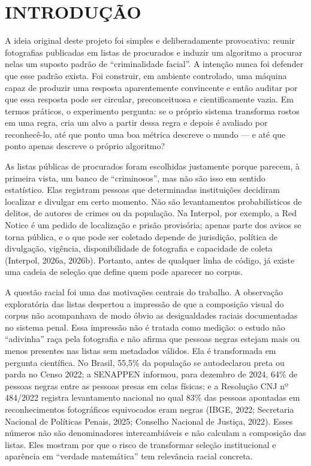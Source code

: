 \chapter{INTRODUÇÃO}

A ideia original deste projeto foi simples e deliberadamente provocativa: reunir fotografias publicadas em listas de procurados e induzir um algoritmo a procurar nelas um suposto padrão de ``criminalidade facial''. A intenção nunca foi defender que esse padrão exista. Foi construir, em ambiente controlado, uma máquina capaz de produzir uma resposta aparentemente convincente e então auditar por que essa resposta pode ser circular, preconceituosa e cientificamente vazia. Em termos práticos, o experimento pergunta: se o próprio sistema transforma rostos em uma regra, cria um alvo a partir dessa regra e depois é avaliado por reconhecê-lo, até que ponto uma boa métrica descreve o mundo --- e até que ponto apenas descreve o próprio algoritmo?

As listas públicas de procurados foram escolhidas justamente porque parecem, à primeira vista, um banco de ``criminosos'', mas não são isso em sentido estatístico. Elas registram pessoas que determinadas instituições decidiram localizar e divulgar em certo momento. Não são levantamentos probabilísticos de delitos, de autores de crimes ou da população. Na Interpol, por exemplo, a Red Notice é um pedido de localização e prisão provisória; apenas parte dos avisos se torna pública, e o que pode ser coletado depende de jurisdição, política de divulgação, vigência, disponibilidade de fotografia e capacidade de coleta (Interpol, 2026a, 2026b). Portanto, antes de qualquer linha de código, já existe uma cadeia de seleção que define quem pode aparecer no corpus.

A questão racial foi uma das motivações centrais do trabalho. A observação exploratória das listas despertou a impressão de que a composição visual do corpus não acompanhava de modo óbvio as desigualdades raciais documentadas no sistema penal. Essa impressão não é tratada como medição: o estudo não ``adivinha'' raça pela fotografia e não afirma que pessoas negras estejam mais ou menos presentes nas listas sem metadados válidos. Ela é transformada em pergunta científica. No Brasil, 55,5\% da população se autodeclarou preta ou parda no Censo 2022; a SENAPPEN informou, para dezembro de 2024, 64\% de pessoas negras entre as pessoas presas em celas físicas; e a Resolução CNJ nº 484/2022 registra levantamento nacional no qual 83\% das pessoas apontadas em reconhecimentos fotográficos equivocados eram negras (IBGE, 2022; Secretaria Nacional de Políticas Penais, 2025; Conselho Nacional de Justiça, 2022). Esses números não são denominadores intercambiáveis e não calculam a composição das listas. Eles mostram por que o risco de transformar seleção institucional e aparência em ``verdade matemática'' tem relevância racial concreta.

